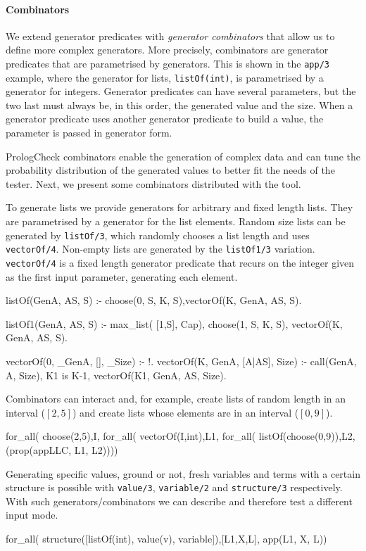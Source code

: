 \documentclass[runningheads,a4paper]{llncs}
\newcommand{\yap}[1]{\lstinline[style=yap]{#1}}
\newcommand{\plqc}[0]{{\sf PrologCheck}}
\begin{document}
\paragraph{\bf Combinators}
We extend generator predicates with \emph{generator combinators} that
allow us to define more complex generators.
%
More precisely, combinators are generator predicates that are parametrised by
generators.
%
This is shown in the \yap{app/3} example, where the generator for lists,
\yap{listOf(int)}, is parametrised by a generator for integers.
%
Generator predicates can have several parameters, but the two last
must always be, in this order, the generated value and the size.
%
When a generator predicate uses another generator predicate to build a
value, the parameter is passed in generator form.


\plqc{} combinators enable the generation of complex data and can tune
the probability distribution of the generated values to better fit the
needs of the tester.
%
Next, we present some combinators distributed with the tool.




To generate lists we provide generators for arbitrary and fixed length
lists.
%
They are parametrised by a generator for the list elements.
%
Random size lists can be generated by \yap{listOf/3}, which randomly
chooses a list length and uses \yap{vectorOf/4}. 
%
Non-empty lists are generated by the \yap{listOf1/3} variation.
%
\yap{vectorOf/4} is a fixed length generator predicate that recurs on
the integer given as the first input parameter, generating each element.
\begin{yapcode}
 listOf(GenA, AS, S) :- choose(0, S, K, S),vectorOf(K, GenA, AS, S).

 listOf1(GenA, AS, S) :- max_list( [1,S], Cap),
   choose(1, S, K, S), vectorOf(K, GenA, AS, S).

 vectorOf(0, _GenA, [], _Size) :- !.
 vectorOf(K, GenA, [A|AS], Size) :-
   call(GenA, A, Size), K1 is K-1, vectorOf(K1, GenA, AS, Size).
\end{yapcode}
%
Combinators can interact and, for example, create lists of random length
in an interval ($[2,5]$) and create lists whose elements are in an
interval ($[0,9]$).
%
\begin{yapcode}
   for_all( choose(2,5),I, for_all( vectorOf(I,int),L1,
     for_all( listOf(choose(0,9)),L2, (prop({appLLC, L1, L2}))))
\end{yapcode}


Generating specific values, ground or not, fresh variables and terms
with a certain structure is possible with \yap{value/3},
\yap{variable/2} and \yap{structure/3} respectively.
%
With such generators/combinators we can describe and therefore test a
different input mode.
\begin{yapcode}
   for_all( structure([listOf(int), value(v), variable]),[L1,X,L],
     app(L1, X, L))
\end{yapcode}
\end{document}
